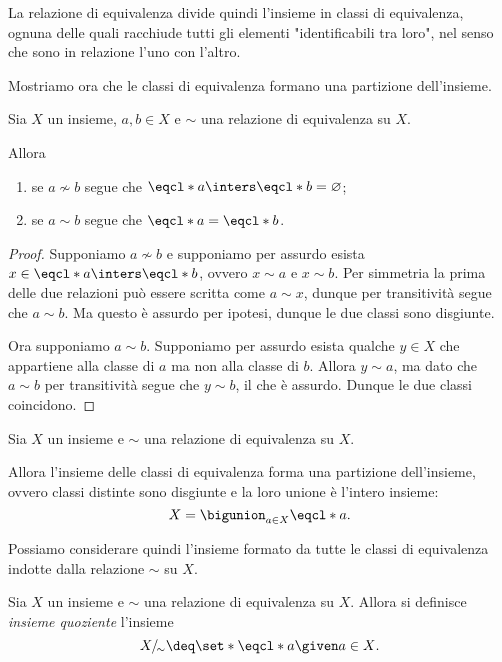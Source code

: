 La relazione di equivalenza divide quindi l'insieme in classi di equivalenza, ognuna delle quali racchiude tutti gli elementi "identificabili tra loro", nel senso che sono in relazione l'uno con l'altro.

Mostriamo ora che le classi di equivalenza formano una partizione dell'insieme.

\begin{lemma}
    Sia $X$ un insieme, $a, b \in X$ e $\sim$ una relazione di equivalenza su $X$.

    Allora \begin{enumerate}
        \item se $a \nsim b$ segue che $\eqcl*{a} \inters \eqcl*{b} = \varnothing$;
        \item se $a \sim b$ segue che $\eqcl*{a} = \eqcl*{b}$.
    \end{enumerate}
\end{lemma}
\begin{proof}
    Supponiamo $a \nsim b$ e supponiamo per assurdo esista $x \in \eqcl*{a} \inters \eqcl*{b}$, ovvero $x \sim a$ e $x \sim b$. Per simmetria la prima delle due relazioni può essere scritta come $a \sim x$, dunque per transitività segue che $a \sim b$. Ma questo è assurdo per ipotesi, dunque le due classi sono disgiunte.

    Ora supponiamo $a \sim b$. Supponiamo per assurdo esista qualche $y \in X$ che appartiene alla classe di $a$ ma non alla classe di $b$. Allora $y \sim a$, ma dato che $a \sim b$ per transitività segue che $y \sim b$, il che è assurdo. Dunque le due classi coincidono.
\end{proof}

\begin{theorem}
    Sia $X$ un insieme e $\sim$ una relazione di equivalenza su $X$.

    Allora l'insieme delle classi di equivalenza forma una partizione dell'insieme, ovvero classi distinte sono disgiunte e la loro unione è l'intero insieme: \[
        X = \bigunion_{a \in X} \eqcl*{a}.    
    \]
\end{theorem}

Possiamo considerare quindi l'insieme formato da tutte le classi di equivalenza indotte dalla relazione $\sim$ su $X$.

\begin{definition}
    Sia $X$ un insieme e $\sim$ una relazione di equivalenza su $X$. Allora si definisce \emph{insieme quoziente} l'insieme \begin{equation}
        X/_{\!\sim} \deq \set*{\eqcl*{a} \given a \in X}.
    \end{equation}
\end{definition}

